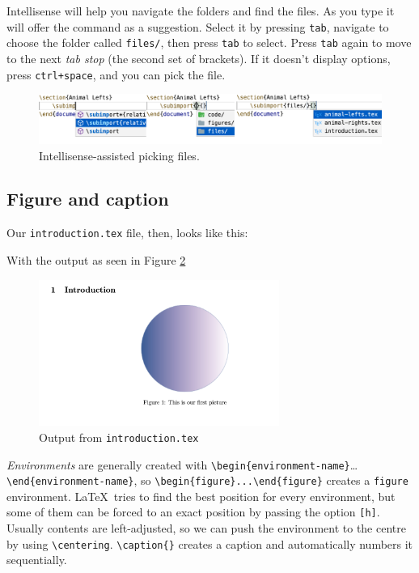 Intellisense will help you navigate the folders and find the files.
As you type \verb|| it will offer the command as a suggestion.
Select it by pressing \verb|tab|, navigate to choose the folder called \verb|files/|, then press \verb|tab| to select.
Press \verb|tab| again to move to the next \emph{tab stop} (the second set of brackets). If it doesn't display options, press \verb|ctrl+space|, and you can pick the file.
\begin{figure}[h]
    \centering
    \includegraphics[width=\textwidth]{figures/subimport.png}
    \caption{Intellisense-assisted picking files.}
    \label{fig:animal-lefts}
\end{figure}

\subsection{Figure and caption}
Our \verb|introduction.tex| file, then, looks like this:


With the output as seen in Figure \ref{fig:figures}

\begin{figure}[h]
    \centering
        \includegraphics[width=0.7\textwidth]{figures/figures.png}
    \caption{Output from \texttt{introduction.tex}}
    \label{fig:figures}
\end{figure}

\emph{Environments} are generally created with \verb|\begin{environment-name}|\dots\verb|\end{environment-name}|, so  
\verb|\begin{figure}...\end{figure}| creates a \texttt{figure} environment.
\LaTeX\ tries to find the best position for every environment, but some of them can be forced to an exact position by passing the option \verb|[h]|.
Usually contents are left-adjusted, so we can push the environment to the centre by using \verb|\centering|.
\verb|\caption{}| creates a caption and automatically numbers it sequentially.

